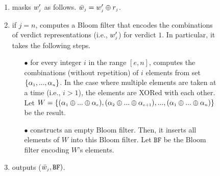\begin{figure}[!htb]
\begin{center}
\begin{tcolorbox}[enhanced,width=5.5in,
    drop fuzzy shadow southwest,
    colframe=black,colback=white]
\begin{enumerate}
%
%
\begin{equation*}
   w'_{\st j}= 
\begin{cases}
   0,              & \text{if } w_{\st j}=0\\
   \alpha_{\st j}=\mathtt{PRF}(\bar k_{\st 0}, 2||o||j||\text{ID}) ,& \text{if } w_{\st j}=1\\

\end{cases}
\end{equation*}
%
\item masks  $w'_{\scriptscriptstyle j}$ as follows. %
%
$\bar w_{\scriptscriptstyle j}= w'_{\scriptscriptstyle j}\oplus r_{\scriptscriptstyle j}$.
%
\item if $j=n$, computes a Bloom filter that encodes the combinations of verdict representations (i.e., $w'_{\scriptscriptstyle j}$)  for verdict $1$. In particular, it takes the following steps. 
\begin{itemize}
%
\item[$\bullet$] for every integer $i$ in the range $[e,n]$, computes the combinations (without repetition) of $i$ elements from set $\{\alpha_{\scriptscriptstyle 1},..., \alpha_{\scriptscriptstyle n}\}$. In the case where  multiple elements are taken at a time (i.e., $i>1$), the elements are XORed with each other. Let $W=\{(\alpha_{\scriptscriptstyle 1}\oplus... \oplus \alpha_{\scriptscriptstyle e}), (\alpha_{\scriptscriptstyle 2}\oplus ... \oplus \alpha_{\scriptscriptstyle e+1}), ..., (\alpha_{\scriptscriptstyle 1}\oplus... \oplus \alpha_{\scriptscriptstyle n})\}$ be the result.  
%
\item[$\bullet$] constructs an empty Bloom filter. Then, it inserts all elements of $W$ into this Bloom filter. Let $\mathtt{BF}$ be the Bloom filter encoding $W$'s elements. 

\end{itemize}
%

%
\item outputs ($\bar{ w}_{\scriptscriptstyle j}, \mathtt{BF})$.






\end{enumerate}
\end{tcolorbox}
\end{center}
\end{figure}
